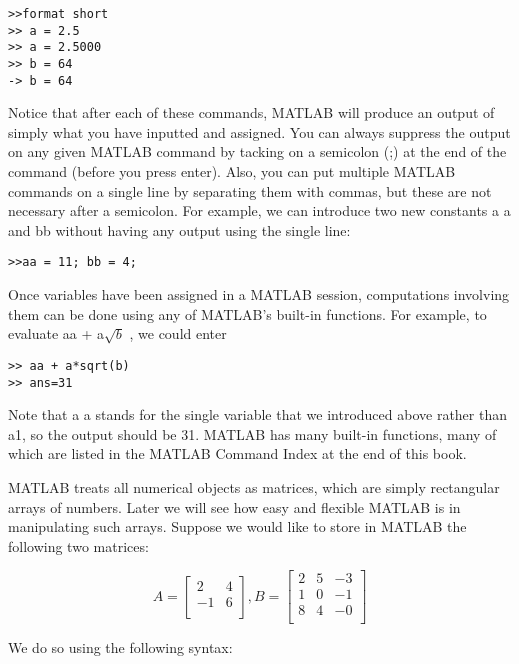 \documentclass[../main.tex]{subfiles}
\begin{document}
\begin{verbatim}
>>format short
>> a = 2.5
>> a = 2.5000 
>> b = 64
-> b = 64 
\end{verbatim}


Notice that after each of these commands, MATLAB will produce an output of
simply what you have inputted and assigned. You can always suppress the output
on any given MATLAB command by tacking on a semicolon (;) at the end of the
command (before you press enter). Also, you can put multiple MATLAB
commands on a single line by separating them with commas, but these are not
necessary after a semicolon. For example, we can introduce two new constants a a
and bb without having any output using the single line: 

\begin{verbatim}
>>aa = 11; bb = 4; 
\end{verbatim}

Once variables have been assigned in a MATLAB session, computations
involving them can be done using any of MATLAB's built-in functions. For
example, to evaluate aa + a$\sqrt{b}$ , we could enter

\begin{verbatim}
>> aa + a*sqrt(b)
>> ans=31
\end{verbatim}

\noindent Note that a a stands for the single variable that we introduced above rather than
a1, so the output should be 31. MATLAB has many built-in functions, many of
which are listed in the MATLAB Command Index at the end of this book. 

MATLAB treats all numerical objects as matrices, which are simply rectangular
arrays of numbers. Later we will see how easy and flexible MATLAB is in manipulating such arrays. Suppose we would like to store in MATLAB the
following two matrices:


\begin{equation*}
	A = 
	\begin{bmatrix}
	2 & 4 \\
	-1 & 6\\
	\end{bmatrix},
	 B =
	\begin{bmatrix}
	2 & 5 & -3 \\
	1 & 0 & -1 \\
	8 & 4 & -0 \\
	\end{bmatrix}
\end{equation*}

\noindent We do so using the following syntax:
\end{document}
